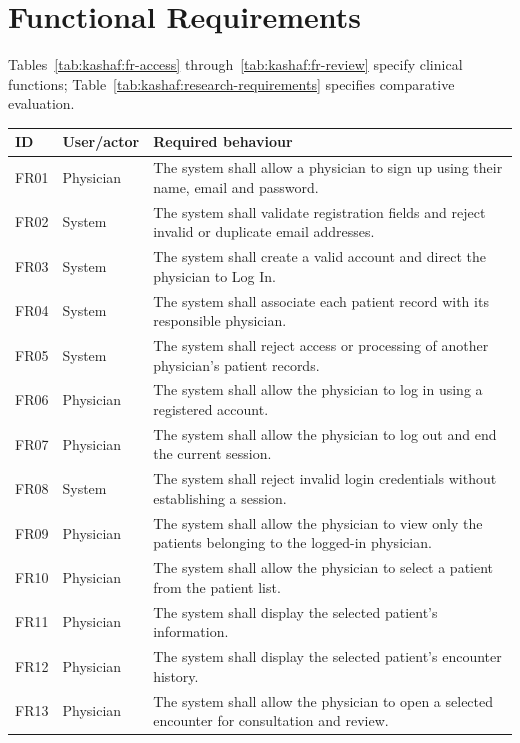 \section{Functional Requirements}

Tables~\ref{tab:kashaf:fr-access} through~\ref{tab:kashaf:fr-review} specify clinical functions; Table~\ref{tab:kashaf:research-requirements} specifies comparative evaluation.

\begin{reporttable}
\centering
\small
\caption{Physician access and patient navigation.}
\label{tab:kashaf:fr-access}
\begin{tabular}{|p{}|p{}|p{}|}
\hline
ID & User/actor & Required behaviour \\ \hline
FR01 & Physician & The system shall allow a physician to sign up using their name, email and password. \\ \hline
FR02 & System & The system shall validate registration fields and reject invalid or duplicate email addresses. \\ \hline
FR03 & System & The system shall create a valid account and direct the physician to Log In. \\ \hline
FR04 & System & The system shall associate each patient record with its responsible physician. \\ \hline
FR05 & System & The system shall reject access or processing of another physician's patient records. \\ \hline
FR06 & Physician & The system shall allow the physician to log in using a registered account. \\ \hline
FR07 & Physician & The system shall allow the physician to log out and end the current session. \\ \hline
FR08 & System & The system shall reject invalid login credentials without establishing a session. \\ \hline
FR09 & Physician & The system shall allow the physician to view only the patients belonging to the logged-in physician. \\ \hline
FR10 & Physician & The system shall allow the physician to select a patient from the patient list. \\ \hline
FR11 & Physician & The system shall display the selected patient's information. \\ \hline
FR12 & Physician & The system shall display the selected patient's encounter history. \\ \hline
FR13 & Physician & The system shall allow the physician to open a selected encounter for consultation and review. \\ \hline
\end{tabular}
\end{reporttable}

